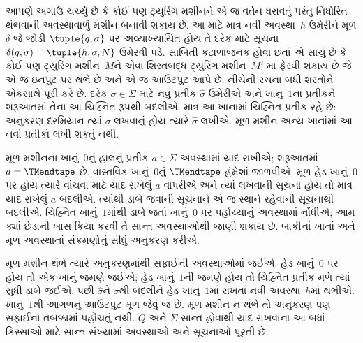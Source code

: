 \begin{explain}
આપણે અગાઉ ચર્ચ્યું છે કે કોઈ પણ ટ્યુરિંગ મશીનને એ જ
વર્તન ધરાવતું પરંતુ નિર્ધારિત થંભવાની અવસ્થાવાળું મશીન
બનાવી શકાય છે. આ માટે માત્ર નવી અવસ્થા~$h$ ઉમેરીને
મૂળ $\delta$ જે જોડી $\tuple{q,\sigma}$ પર અવ્યાખ્યાયિત
હોય તે દરેક માટે સૂચના
$\delta(q, \sigma) = \tuple{h, \sigma, N}$ ઉમેરવી પડે.
સાબિતી કંટાળાજનક હોવા છતાં એ સાચું છે કે કોઈ પણ
ટ્યુરિંગ મશીન~$M$ને એવા શિસ્તબદ્ધ ટ્યુરિંગ મશીન~$M'$
માં ફેરવી શકાય છે જે એ જ ઇનપુટ પર થંભે છે અને એ જ
આઉટપુટ આપે છે. નીચેની રચના બધી શરતોને એકસાથે પૂરી કરે છે.
દરેક $\sigma\in\Sigma$ માટે નવું પ્રતીક $\widehat\sigma$
ઉમેરીએ અને ખાનું~$1$ના પ્રતીકને શરૂઆતમાં તેના આ ચિહ્નિત
રૂપથી બદલીએ. માત્ર આ ખાનામાં ચિહ્નિત પ્રતીક રહે છે:
અનુકરણ દરમિયાન ત્યાં $\sigma$ લખવાનું હોય ત્યારે
$\widehat\sigma$ લખીએ. મૂળ મશીન અન્ય ખાનાંમાં આ નવાં
પ્રતીકો લખી શકતું નથી.

મૂળ મશીનના ખાનું~$0$નું હાલનું પ્રતીક $a\in\Sigma$
અવસ્થામાં યાદ રાખીએ; શરૂઆતમાં $a=\TMendtape$ છે.
વાસ્તવિક ખાનું~$0$નું $\TMendtape$ હંમેશાં જાળવીએ.
મૂળ હેડ ખાનું~$0$ પર હોય ત્યારે વાંચવા માટે યાદ રાખેલું
$a$ વાપરીએ અને ત્યાં લખવાની સૂચના હોય તો માત્ર યાદ રાખેલું
$a$ બદલીએ. ત્યાંથી ડાબે જવાની સૂચનાને એ જ સ્થાને રહેવાની
સૂચનાથી બદલીએ. ચિહ્નિત ખાનું~$1$માંથી ડાબે જતાં ખાનું~$0$
પર પહોંચ્યાનું અવસ્થામાં નોંધીએ; આમ ક્યાં છેડાની ખાસ
ક્રિયા કરવી તે સાન્ત અવસ્થાઓથી જાણી શકાય છે. બાકીનાં
ખાનાં અને મૂળ અવસ્થાનાં સંક્રમણોનું સીધું અનુકરણ કરીએ.

મૂળ મશીન થંભે ત્યારે અનુકરણમાંથી સફાઈની અવસ્થાઓમાં
જઈએ. હેડ ખાનું~$0$ પર હોય તો એક ખાનું જમણે જઈએ;
હેડ ખાનું~$1$ની જમણે હોય તો ચિહ્નિત પ્રતીક મળે ત્યાં
સુધી ડાબે જઈએ. પછી $\widehat\sigma$ને $\sigma$થી
બદલીને હેડ ખાનું~$1$માં રાખતાં નવી અવસ્થા~$h$માં થંભીએ.
ખાનું~$1$થી આગળનું આઉટપુટ મૂળ જેવું જ છે. મૂળ મશીન
ન થંભે તો અનુકરણ પણ સફાઈના તબક્કામાં પહોંચતું નથી.
$Q$ અને $\Sigma$ સાન્ત હોવાથી યાદ રાખવાના આ બધાં કિસ્સાઓ
માટે સાન્ત સંખ્યામાં અવસ્થાઓ અને સૂચનાઓ પૂરતી છે.
\end{explain}


